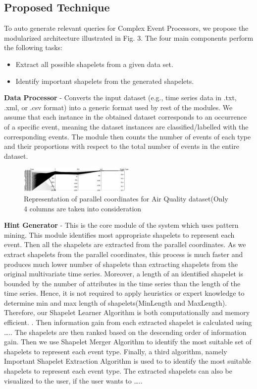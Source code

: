 \documentclass[letterpaper, 10 pt, conference]{IEEEtran}  %
\begin{document}
\subsection{Proposed Technique}
To auto generate relevant queries for Complex Event Processors, we propose the modularized architecture illustrated in Fig. 3. The four main components perform the following tasks:

\begin{itemize}
\item Extract all possible shapelets from a given data set.
\item Identify important shapelets from the generated shapelets.
\end{itemize}

\textbf{Data Processor} - Converts the input dataset (e.g., time series data in .txt, .xml, or .csv format) into a generic format used by rest of the modules. We assume that each instance in the obtained dataset corresponds to an occurrence of a specific event, meaning the dataset instances are classified/labelled with the corresponding events. The module then counts  the number of events of each type and their proportions with respect to the total number of events in the entire dataset.
\begin{figure}[h!]
\includegraphics[width=0.5\textwidth]{airQuality.png}
\caption{Representation of parallel coordinates for Air Quality dataset(Only 4 columns are taken into consideration}
\end{figure}

\textbf{Hint Generator}	- This is the core module of the system which uses pattern mining. This module identifies most appropriate shapelets to represent each event.  Then all the shapelets are extracted from the parallel coordinates. As we extract shapelets from the parallel coordinates, this process is much faster and produces much lower number of shapelets than extracting shapelets from the original multivariate time series. Moreover, a length of an identified shapelet is bounded by the number of attributes in the time series than the length of the time series. Hence, it is not required to apply heuristics or expert knowledge to determine min and max length of shapelets(MinLength and MaxLength). Therefore, our Shapelet Learner Algorithm is both computationally and memory efficient. . Then information gain from each extracted shapelet is calculated using ….. The shapelets are then ranked based on the descending order of information gain. Then we use Shapelet Merger Algorithm to identify the most suitable set of shapelets to represent each event type. Finally, a third algorithm, namely Important Shapelet Extraction Algorithm is used to  to identify the most suitable shapelets to represent each event type. The extracted shapelets can also be visualized to the user, if the user wants to ….. 
\end{document}
